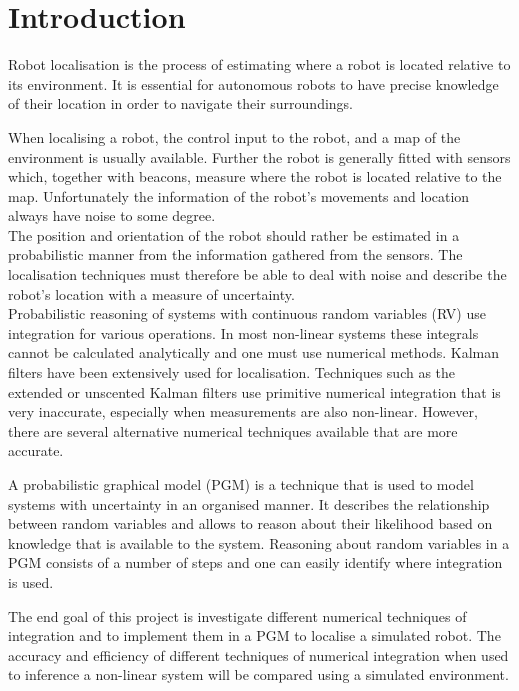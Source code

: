 \documentclass[12pt,oneside,openany,a4paper, %
afrikaans,english,
]{memoir}
\numberwithin{equation}{chapter}
\begin{document}
\mainmatter
\chapter{Introduction}
Robot localisation is the process of estimating where a robot is located relative to its environment. It is essential for autonomous robots to have precise knowledge of their location in order to navigate their surroundings.

When localising a robot, the control input to the robot, and a map of the environment is usually available. Further the robot is generally fitted with sensors which, together with beacons, measure where the robot is located relative to the map. Unfortunately the information of the robot's movements and location always have noise to some degree.\\
The position and orientation of the robot should rather be estimated in a probabilistic manner from the information gathered from the sensors. The localisation techniques must therefore be able to deal with noise and describe the robot's location with a measure of uncertainty.\\
Probabilistic reasoning of systems with continuous random variables (RV) use integration for various operations. In most non-linear systems these integrals cannot be calculated analytically and one must use numerical methods. Kalman filters have been extensively used for localisation. Techniques such as the extended or unscented Kalman filters use primitive numerical integration that is very inaccurate, especially when measurements are also non-linear. However, there are several alternative numerical techniques available that are more accurate.

A probabilistic graphical model (PGM) is a technique that is used to model systems with uncertainty in an organised manner. It describes the relationship between random variables and allows to reason about their likelihood based on knowledge that is available to the system. Reasoning about random variables in a PGM consists of a number of steps and one can easily identify where integration is used.

The end goal of this project is investigate different numerical techniques of integration and to implement them in a PGM to localise a simulated robot. The accuracy and efficiency of different techniques of numerical integration when used to inference a non-linear system will be compared using a simulated environment.
\setcounter{secnumdepth}{2}
\end{document}
